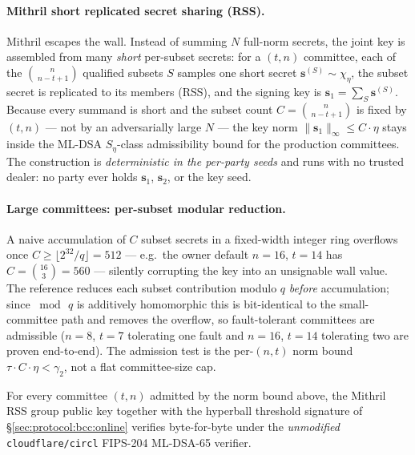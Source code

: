 \paragraph{Mithril short replicated secret sharing (RSS).}
Mithril \cite{mithril2026} escapes the wall. Instead of summing $N$
full-norm secrets, the joint key is assembled from many \emph{short}
per-subset secrets: for a $(t, n)$ committee, each of the
$\binom{n}{\,n-t+1}$ qualified subsets $S$ samples one short secret
$\mathbf{s}^{(S)} \sim \chi_\eta$, the subset secret is replicated to its
members (RSS), and the signing key is $\mathbf{s}_1 = \sum_S
\mathbf{s}^{(S)}$. Because every summand is short and the subset count
$C = \binom{n}{\,n-t+1}$ is fixed by $(t, n)$ --- not by an adversarially
large $N$ --- the key norm $\|\mathbf{s}_1\|_\infty \leq C\cdot\eta$ stays
inside the ML-DSA $S_\eta$-class admissibility bound for the production
committees. The construction is \emph{deterministic in the per-party
seeds} and runs with no trusted dealer: no party ever holds
$\mathbf{s}_1$, $\mathbf{s}_2$, or the key seed.

\paragraph{Large committees: per-subset modular reduction.}
A naive accumulation of $C$ subset secrets in a fixed-width integer ring
overflows once $C \geq \lfloor 2^{32}/q \rfloor = 512$ --- e.g.\ the owner
default $n{=}16$, $t{=}14$ has $C = \binom{16}{3} = 560$ --- silently
corrupting the key into an unsignable wall value. The reference reduces
each subset contribution modulo $q$ \emph{before} accumulation; since
$\bmod\,q$ is additively homomorphic this is bit-identical to the
small-committee path and removes the overflow, so fault-tolerant
committees are admissible ($n{=}8$, $t{=}7$ tolerating one fault and
$n{=}16$, $t{=}14$ tolerating two are proven end-to-end). The admission
test is the per-$(n,t)$ norm bound $\tau \cdot C \cdot \eta < \gamma_2$,
not a flat committee-size cap.

\begin{theorem}
\label{thm:mithril-rss-keygen}
For every committee $(t, n)$ admitted by the norm bound above, the
Mithril RSS group public key together with the hyperball threshold
signature of \S\ref{sec:protocol:bcc:online} verifies byte-for-byte under
the \emph{unmodified} \texttt{cloudflare/circl} FIPS-204 ML-DSA-65
verifier.
\end{theorem}


